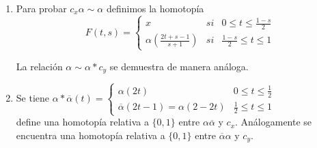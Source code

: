 \documentclass[bibtex, anon]{TEMat-article}
\begin{document}
\begin{demostracion}
\begin{enumerate}
		\item Para probar $c_x\alpha\sim\alpha$ definimos la homotopía
		\[
		F(t,s)=\left\{\begin{array}{lcc}
		x & si & 0\leq t\leq\frac{1-s}{2}\\
		\alpha\left(\frac{2t+s-1}{s+1}\right) & si & \frac{1-s}{2}\leq t\leq 1
		\end{array}\right.
		\]
		
		La relación $\alpha\sim\alpha*c_y$ se demuestra de manera análoga.
		
		\item Se tiene $\alpha*\overline{\alpha}(t)=\left\{\begin{array}{lc}
		\alpha(2t) & 0\leq t\leq\frac{1}{2}\\
		\overline{\alpha}(2t-1)=\alpha(2-2t) & \frac{1}{2}\leq t\leq 1
		\end{array}\right.$\\
		
%		
%		
		
		
		define una homotopía relativa a $\{0,1\}$ entre $\alpha\overline{\alpha}$ y $c_x$. Análogamente se encuentra una homotopía relativa a $\{0,1\}$ entre $\overline{\alpha}\alpha$ y $c_y$.
	\end{enumerate}
\end{demostracion}
\end{document}
